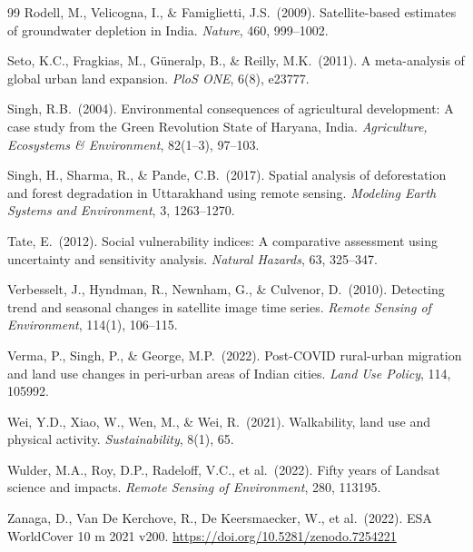 \documentclass[12pt,a4paper]{article}
\begin{document}
\begin{thebibliography}{99}
Rodell, M., Velicogna, I., \& Famiglietti, J.S.\ (2009).
\newblock Satellite-based estimates of groundwater depletion in India.
\newblock \textit{Nature}, 460, 999--1002.

Seto, K.C., Fragkias, M., G\"{u}neralp, B., \& Reilly, M.K.\ (2011).
\newblock A meta-analysis of global urban land expansion.
\newblock \textit{PloS ONE}, 6(8), e23777.

Singh, R.B.\ (2004).
\newblock Environmental consequences of agricultural development: A case study from the Green Revolution State of Haryana, India.
\newblock \textit{Agriculture, Ecosystems \& Environment}, 82(1--3), 97--103.

Singh, H., Sharma, R., \& Pande, C.B.\ (2017).
\newblock Spatial analysis of deforestation and forest degradation in Uttarakhand using remote sensing.
\newblock \textit{Modeling Earth Systems and Environment}, 3, 1263--1270.

Tate, E.\ (2012).
\newblock Social vulnerability indices: A comparative assessment using uncertainty and sensitivity analysis.
\newblock \textit{Natural Hazards}, 63, 325--347.

Verbesselt, J., Hyndman, R., Newnham, G., \& Culvenor, D.\ (2010).
\newblock Detecting trend and seasonal changes in satellite image time series.
\newblock \textit{Remote Sensing of Environment}, 114(1), 106--115.

Verma, P., Singh, P., \& George, M.P.\ (2022).
\newblock Post-COVID rural-urban migration and land use changes in peri-urban areas of Indian cities.
\newblock \textit{Land Use Policy}, 114, 105992.

Wei, Y.D., Xiao, W., Wen, M., \& Wei, R.\ (2021).
\newblock Walkability, land use and physical activity.
\newblock \textit{Sustainability}, 8(1), 65.

Wulder, M.A., Roy, D.P., Radeloff, V.C., et al.\ (2022).
\newblock Fifty years of Landsat science and impacts.
\newblock \textit{Remote Sensing of Environment}, 280, 113195.

Zanaga, D., Van De Kerchove, R., De Keersmaecker, W., et al.\ (2022).
\newblock ESA WorldCover 10 m 2021 v200.
\newblock \url{https://doi.org/10.5281/zenodo.7254221}

\end{thebibliography}
\end{document}
